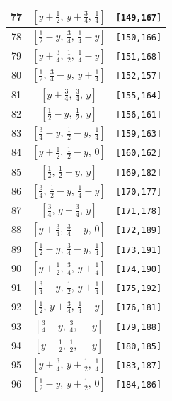 \documentclass[fleqn,8pt]{jsarticle}
\begin{document}
\begin{longtable}{ccc}
77 & $\left[ y + \frac{1}{2},\, y + \frac{3}{4},\, \frac{1}{4} \right]$ & {\tt [149,167]} \\ \hline
78 & $\left[ \frac{1}{2} - y,\, \frac{3}{4},\, \frac{1}{4} - y \right]$ & {\tt [150,166]} \\ \hline
79 & $\left[ y + \frac{3}{4},\, \frac{1}{2},\, \frac{1}{4} - y \right]$ & {\tt [151,168]} \\ \hline
80 & $\left[ \frac{1}{2},\, \frac{3}{4} - y,\, y + \frac{1}{4} \right]$ & {\tt [152,157]} \\ \hline
81 & $\left[ y + \frac{3}{4},\, \frac{3}{4},\, y \right]$ & {\tt [155,164]} \\ \hline
82 & $\left[ \frac{1}{2} - y,\, \frac{1}{2},\, y \right]$ & {\tt [156,161]} \\ \hline
83 & $\left[ \frac{3}{4} - y,\, \frac{1}{2} - y,\, \frac{1}{4} \right]$ & {\tt [159,163]} \\ \hline
84 & $\left[ y + \frac{1}{2},\, \frac{1}{2} - y,\, 0 \right]$ & {\tt [160,162]} \\ \hline
85 & $\left[ \frac{1}{2},\, \frac{1}{2} - y,\, y \right]$ & {\tt [169,182]} \\ \hline
86 & $\left[ \frac{3}{4},\, \frac{1}{2} - y,\, \frac{1}{4} - y \right]$ & {\tt [170,177]} \\ \hline
87 & $\left[ \frac{3}{4},\, y + \frac{3}{4},\, y \right]$ & {\tt [171,178]} \\ \hline
88 & $\left[ y + \frac{3}{4},\, \frac{3}{4} - y,\, 0 \right]$ & {\tt [172,189]} \\ \hline
89 & $\left[ \frac{1}{2} - y,\, \frac{3}{4} - y,\, \frac{1}{4} \right]$ & {\tt [173,191]} \\ \hline
90 & $\left[ y + \frac{1}{2},\, \frac{3}{4},\, y + \frac{1}{4} \right]$ & {\tt [174,190]} \\ \hline
91 & $\left[ \frac{3}{4} - y,\, \frac{1}{2},\, y + \frac{1}{4} \right]$ & {\tt [175,192]} \\ \hline
92 & $\left[ \frac{1}{2},\, y + \frac{3}{4},\, \frac{1}{4} - y \right]$ & {\tt [176,181]} \\ \hline
93 & $\left[ \frac{3}{4} - y,\, \frac{3}{4},\, - y \right]$ & {\tt [179,188]} \\ \hline
94 & $\left[ y + \frac{1}{2},\, \frac{1}{2},\, - y \right]$ & {\tt [180,185]} \\ \hline
95 & $\left[ y + \frac{3}{4},\, y + \frac{1}{2},\, \frac{1}{4} \right]$ & {\tt [183,187]} \\ \hline
96 & $\left[ \frac{1}{2} - y,\, y + \frac{1}{2},\, 0 \right]$ & {\tt [184,186]} \\
\end{longtable}
\end{document}

